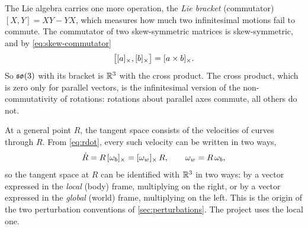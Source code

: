 The Lie algebra carries one more operation, the \emph{Lie bracket} (commutator) $[X, Y] = XY - YX$, which measures how much two infinitesimal
motions fail to commute. The commutator of two skew-symmetric matrices is skew-symmetric, and by \eqref{eq:skew-commutator}
\begin{equation}
  \big[[a]_{\times}, [b]_{\times}\big] = [a \times b]_{\times} .
\end{equation}
So $\mathfrak{so}(3)$ with its bracket is $\mathbb{R}^3$ with the cross product. The cross product, which is zero only for parallel vectors, is the infinitesimal
version of the non-commutativity of rotations: rotations about parallel axes commute, all others do not.

At a general point $R$, the tangent space consists of the velocities of curves through $R$. From
\eqref{eq:rdot}, every such velocity can be written in two ways,
\begin{equation}
  \dot R = R\,[\omega_b]_{\times} = [\omega_w]_{\times}\,R, \qquad \omega_w = R\,\omega_b,
\end{equation}
so the tangent space at $R$ can be identified with $\mathbb{R}^3$ in two ways: by a vector expressed in the
\emph{local} (body) frame, multiplying on the right, or by a vector expressed in the \emph{global}
(world) frame, multiplying on the left. This is the origin of the two perturbation conventions of
\cref{sec:perturbations}. The project uses the local one.

